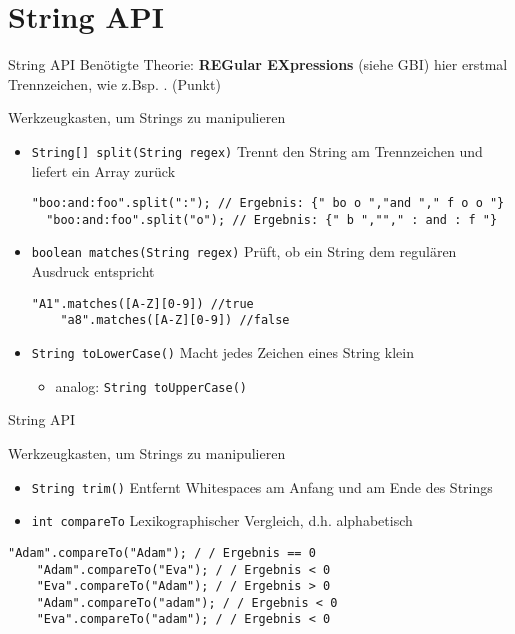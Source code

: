 \documentclass[18pt]{beamer}
\begin{document}
\section{String API}
\begin{frame}[fragile]{String API}
Benötigte Theorie: \textbf{REGular EXpressions} (siehe GBI) hier erstmal Trennzeichen, wie z.Bsp.     . (Punkt) \pause
\begin{block}{Werkzeugkasten, um Strings zu manipulieren}\pause
\begin{itemize}
	\item \lstinline{String[] split(String regex)} Trennt den String am Trennzeichen und liefert ein Array zurück\pause
	\begin{lstlisting}[basicstyle=\scriptsize]
	"boo:and:foo".split(":"); // Ergebnis: {" bo o ","and "," f o o "} 
  "boo:and:foo".split("o"); // Ergebnis: {" b ",""," : and : f "} 
	\end{lstlisting}  \pause
	\item \lstinline{boolean matches(String regex)} Prüft, ob ein String dem regulären Ausdruck entspricht \pause
	\begin{lstlisting}[basicstyle=\scriptsize]
	"A1".matches([A-Z][0-9]) //true 
	"a8".matches([A-Z][0-9]) //false 
	\end{lstlisting} \pause
	\item \lstinline{String toLowerCase()} Macht jedes Zeichen eines String klein\pause
	\begin{itemize}
		\item analog: \lstinline{String toUpperCase()} \pause
	\end{itemize}
\end{itemize}
\end{block}
\end{frame}


\begin{frame}[fragile]{String API}
\begin{block}{Werkzeugkasten, um Strings zu manipulieren} \pause
\begin{itemize}
\item \lstinline{String trim()} Entfernt Whitespaces am Anfang und am Ende des Strings \pause
\item \lstinline{int compareTo} Lexikographischer Vergleich, d.h. alphabetisch \pause
\end{itemize}	 \pause
\begin{lstlisting}[basicstyle=\footnotesize]
	"Adam".compareTo("Adam"); / / Ergebnis == 0 
	"Adam".compareTo("Eva"); / / Ergebnis < 0 
	"Eva".compareTo("Adam"); / / Ergebnis > 0 
	"Adam".compareTo("adam"); / / Ergebnis < 0 
	"Eva".compareTo("adam"); / / Ergebnis < 0 
\end{lstlisting} 
\end{block}
\end{frame}
\end{document}
